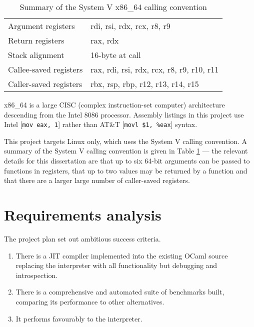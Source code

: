 \begin{table}[h]
    \centering

    \begin{tabular}{ll}\toprule
        Argument registers     & rdi, rsi, rdx, rcx, r8, r9                \\
        Return registers       & rax, rdx                                  \\
        Stack alignment        & 16-byte at call                           \\
        Callee-saved registers & rax, rdi, rsi, rdx, rcx, r8, r9, r10, r11 \\
        Caller-saved registers & rbx, rsp, rbp, r12, r13, r14, r15         \\
        \bottomrule
    \end{tabular}

    \caption{Summary of the System V x86\_64 calling convention}
    \label{table:systemv}

\end{table}

x86\_64 is a large CISC (complex instruction-set computer) architecture descending from the Intel
8086 processor.
Assembly listings in this project use Intel
    [\texttt{mov eax, 1}] rather than AT\&T [\texttt{movl
    \$1, \%eax}] syntax.

This project targets Linux only, which uses the System V calling convention.  A summary of the
System V calling convention is given in Table \ref{table:systemv} --- the relevant details for this
dissertation are that up to six 64-bit arguments can be passed to functions in registers, that up
to two values may be returned by a function and that there are a larger large number of
caller-saved
registers.

\section{Requirements analysis}

The project plan set out ambitious success criteria.

\begin{enumerate}
    \item There is a JIT compiler implemented into the existing OCaml source
          replacing the interpreter with all functionality but debugging
          and introspection.
    \item There is a comprehensive and automated suite of benchmarks built,
          comparing its performance to other alternatives.
    \item It performs favourably to the interpreter.
\end{enumerate}

